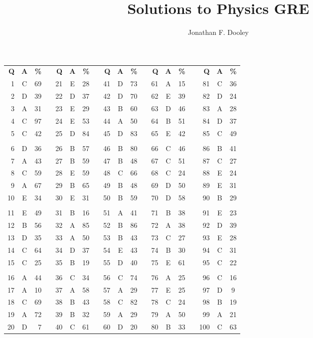 \documentclass[12pt]{article}
\title{Solutions to \Year Physics GRE}
\author{Jonathan F. Dooley}
\newcommand{\Year}{1992}
\newcommand{\Ident}{GR9277}
\newcommand{\Version}{2.0}
\begin{document}
\TitlePage{\Year}{\Ident}{\Version}

\begin{table}
\centering
\begin{tabular}{rcrc rcrc rcrc rcrc rcc}
\textbf{Q} & \textbf{A} & \textbf{\%} &&
\textbf{Q} & \textbf{A} & \textbf{\%} &&
\textbf{Q} & \textbf{A} & \textbf{\%} &&
\textbf{Q} & \textbf{A} & \textbf{\%} &&
\textbf{Q} & \textbf{A} & \textbf{\%} \\
1  & C & 69 && 21 & E & 28 && 41 & D & 73 && 61 & A & 15 && 81  & C & 36 \\
2  & D & 39 && 22 & D & 37 && 42 & D & 70 && 62 & E & 39 && 82  & D & 24 \\
3  & A & 31 && 23 & E & 29 && 43 & B & 60 && 63 & D & 46 && 83  & A & 28 \\
4  & C & 97 && 24 & E & 53 && 44 & A & 50 && 64 & B & 51 && 84  & D & 37 \\
5  & C & 42 && 25 & D & 84 && 45 & D & 83 && 65 & E & 42 && 85  & C & 49 \\
   &   &    &&    &   &    &&    &   &    &&    &   &    &&     &   &    \\
6  & D & 36 && 26 & B & 57 && 46 & B & 80 && 66 & C & 46 && 86  & B & 41 \\
7  & A & 43 && 27 & B & 59 && 47 & B & 48 && 67 & C & 51 && 87  & C & 27 \\
8  & C & 59 && 28 & E & 59 && 48 & C & 66 && 68 & C & 24 && 88  & E & 24 \\
9  & A & 67 && 29 & B & 65 && 49 & B & 48 && 69 & D & 50 && 89  & E & 31 \\
10 & E & 34 && 30 & E & 31 && 50 & B & 59 && 70 & D & 58 && 90  & B & 29 \\
   &   &    &&    &   &    &&    &   &    &&    &   &    &&     &   &    \\
11 & E & 49 && 31 & B & 16 && 51 & A & 41 && 71 & B & 38 && 91  & E & 23 \\
12 & B & 56 && 32 & A & 85 && 52 & B & 86 && 72 & A & 38 && 92  & D & 39 \\
13 & D & 35 && 33 & A & 50 && 53 & B & 43 && 73 & C & 27 && 93  & E & 28 \\
14 & C & 64 && 34 & D & 37 && 54 & E & 43 && 74 & B & 30 && 94  & C & 31 \\
15 & C & 25 && 35 & B & 19 && 55 & D & 40 && 75 & E & 61 && 95  & C & 22 \\
   &   &    &&    &   &    &&    &   &    &&    &   &    &&     &   &    \\
16 & A & 44 && 36 & C & 34 && 56 & C & 74 && 76 & A & 25 && 96  & C & 16 \\
17 & A & 10 && 37 & A & 58 && 57 & A & 29 && 77 & E & 25 && 97  & D & 9  \\
18 & C & 69 && 38 & B & 43 && 58 & C & 82 && 78 & C & 24 && 98  & B & 19 \\
19 & A & 72 && 39 & B & 32 && 59 & A & 29 && 79 & A & 50 && 99  & A & 21 \\
20 & D & 7  && 40 & C & 61 && 60 & D & 20 && 80 & B & 33 && 100 & C & 63
\end{tabular}
\end{table}
\end{document}
